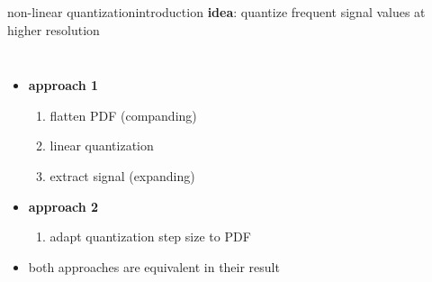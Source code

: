 	\begin{frame}{non-linear quantization}{introduction}
		\textbf{idea}: quantize frequent signal values at higher resolution
		
        \begin{columns}
            \begin{itemize}
                \item<2-> \textbf{approach 1 }	
                    \begin{enumerate}
                        \item	flatten PDF (companding)
                        \item	linear quantization
                        \item	extract signal (expanding)
                    \end{enumerate}
                \item<3-> \textbf{approach 2 }	
                    \begin{enumerate}
                        \item	adapt quantization step size to PDF
                    \end{enumerate}
                \bigskip
                \item<4->[$\Rightarrow$] both approaches are equivalent in their result
            \end{itemize}
        \end{columns}
	\end{frame}	

